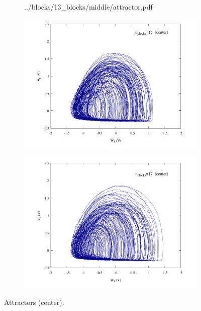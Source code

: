 \begin{figure}
\begin{minipage}{.47\textwidth}
\begin{subfigure}{\linewidth}
            {../blocks/13_blocks/middle/attractor.pdf}
        \end{subfigure}
    \end{minipage}
    \begin{minipage}{.47\textwidth}
        \begin{subfigure}{\linewidth}
            \centering
            \includegraphics[width=\linewidth]
            {../blocks/15_blocks/middle/attractor.pdf}
        \end{subfigure}
    \end{minipage}
    \begin{minipage}{.47\textwidth}
        \begin{subfigure}{\linewidth}
            \centering
            \includegraphics[width=\linewidth]
            {../blocks/17_blocks/middle/attractor.pdf}
        \end{subfigure}
    \end{minipage}
    \caption{Attractors (center).}
    \label{fig:attractors 3-17 middle}
\end{figure}

